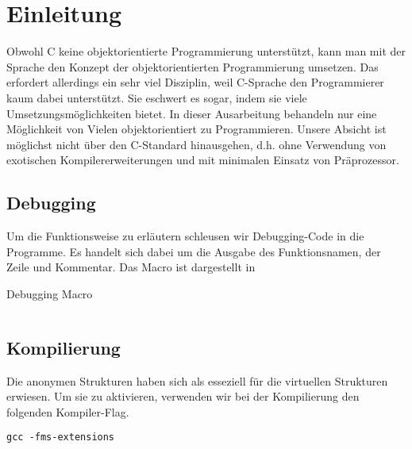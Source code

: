 \section{Einleitung}
Obwohl C keine objektorientierte Programmierung unterstützt, kann man mit der Sprache den Konzept der objektorientierten Programmierung umsetzen.
Das erfordert allerdings ein sehr viel Disziplin, weil C-Sprache den Programmierer kaum dabei unterstützt.
Sie eschwert es sogar, indem sie viele Umsetzungsmöglichkeiten bietet.
In dieser Ausarbeitung behandeln nur eine Möglichkeit von Vielen objektorientiert zu Programmieren.
Unsere Absicht ist möglichst nicht über den C-Standard hinausgehen, d.h. ohne Verwendung von exotischen Kompilererweiterungen und mit minimalen Einsatz von Präprozessor.


\subsection{Debugging}
Um die Funktionsweise zu erläutern schleusen wir Debugging-Code in die Programme.
Es handelt sich dabei um die Ausgabe des Funktionsnamen, der Zeile und Kommentar.
Das Macro ist dargestellt in 

\begin{code}
	\caption{Debugging Macro}
	\label{code:debug}
	\inputminted{c}{code/examples/employees_virt/debug.h}
\end{code}

\subsection{Kompilierung}
Die anonymen Strukturen haben sich als esseziell für die virtuellen Strukturen erwiesen.
Um sie zu aktivieren, verwenden wir bei der Kompilierung den folgenden Kompiler-Flag.
\begin{code}
	\begin{verbatim}
gcc -fms-extensions
	\end{verbatim}
\end{code}

